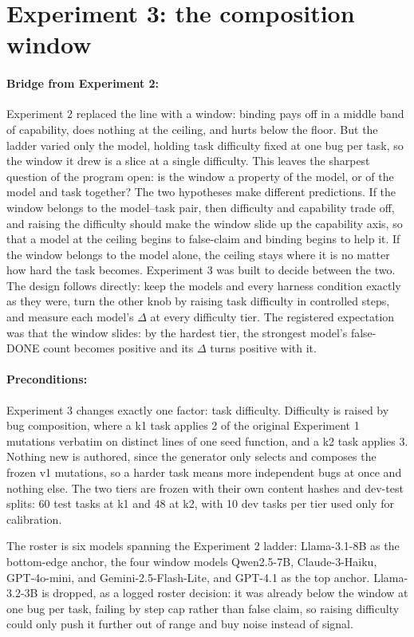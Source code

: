 \section{Experiment 3: the composition window}

\paragraph{Bridge from Experiment 2:} Experiment 2 replaced the line with a window: binding pays off in a middle band of capability, does nothing at the ceiling, and hurts below the floor. But the ladder varied only the model, holding task difficulty fixed at one bug per task, so the window it drew is a slice at a single difficulty. This leaves the sharpest question of the program open: is the window a property of the model, or of the model and task together? The two hypotheses make different predictions. If the window belongs to the model--task pair, then difficulty and capability trade off, and raising the difficulty should make the window slide up the capability axis, so that a model at the ceiling begins to false-claim and binding begins to help it. If the window belongs to the model alone, the ceiling stays where it is no matter how hard the task becomes. Experiment 3 was built to decide between the two. The design follows directly: keep the models and every harness condition exactly as they were, turn the other knob by raising task difficulty in controlled steps, and measure each model's $\Delta$ at every difficulty tier. The registered expectation was that the window slides: by the hardest tier, the strongest model's false-DONE count becomes positive and its $\Delta$ turns positive with it.

\paragraph{Preconditions:} Experiment 3 changes exactly one factor: task difficulty. Difficulty is raised by bug composition, where a k1 task applies 2 of the original Experiment 1 mutations verbatim on distinct lines of one seed function, and a k2 task applies 3. Nothing new is authored, since the generator only selects and composes the frozen v1 mutations, so a harder task means more independent bugs at once and nothing else. The two tiers are frozen with their own content hashes and dev-test splits: 60 test tasks at k1 and 48 at k2, with 10 dev tasks per tier used only for calibration.

The roster is six models spanning the Experiment 2 ladder: Llama-3.1-8B as the bottom-edge anchor, the four window models Qwen2.5-7B, Claude-3-Haiku, GPT-4o-mini, and Gemini-2.5-Flash-Lite, and GPT-4.1 as the top anchor. Llama-3.2-3B is dropped, as a logged roster decision: it was already below the window at one bug per task, failing by step cap rather than false claim, so raising difficulty could only push it further out of range and buy noise instead of signal.

